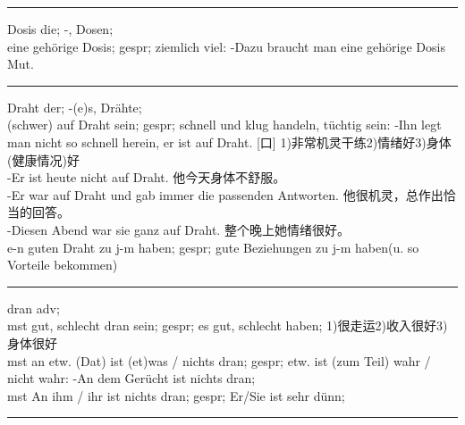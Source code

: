 \noindent\rule{\textwidth}{1pt}
Dosis die; -, Dosen; \\
eine geh\"orige Dosis; gespr; ziemlich viel: -Dazu braucht man eine geh\"orige Dosis Mut. \\

\noindent\rule{\textwidth}{1pt}
Draht der; -(e)s, Dr\"ahte;\\
(schwer) auf Draht sein; gespr; schnell und klug handeln, t\"uchtig sein: -Ihn legt man nicht so schnell herein, er ist auf Draht. [口] 1)非常机灵干练2)情绪好3)身体(健康情况)好\\
-Er ist heute nicht auf Draht. 他今天身体不舒服。\\
-Er war auf Draht und gab immer die passenden Antworten. 他很机灵，总作出恰当的回答。\\
-Diesen Abend war sie ganz auf Draht. 整个晚上她情绪很好。\\
e-n guten Draht zu j-m haben; gespr; gute Beziehungen zu j-m haben(u. so Vorteile bekommen) \\

\noindent\rule{\textwidth}{1pt}
dran adv; \\
mst gut, schlecht dran sein; gespr; es gut, schlecht haben; 1)很走运2)收入很好3)身体很好\\
mst an etw. (Dat) ist (et)was / nichts dran; gespr; etw. ist (zum Teil) wahr / nicht wahr: -An dem Ger\"ucht ist nichts dran; \\
mst An ihm / ihr ist nichts dran; gespr; Er/Sie ist sehr d\"unn; \\

\noindent\rule{\textwidth}{1pt}




